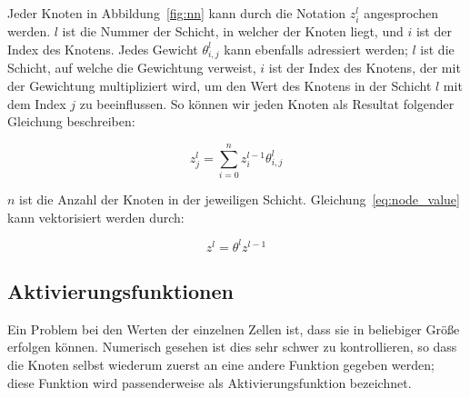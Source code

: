 Jeder Knoten in Abbildung~\ref{fig:nn} kann durch die Notation $z^l_i$ angesprochen werden.
$l$ ist die Nummer der Schicht, in welcher der Knoten liegt, und $i$ ist der Index des Knotens.
Jedes Gewicht $\theta^l_{i, j}$ kann ebenfalls adressiert werden; $l$ ist die Schicht, auf welche die Gewichtung verweist, $i$ ist der Index des Knotens, der mit der Gewichtung multipliziert wird, um den Wert des Knotens in der Schicht $l$ mit dem Index $j$ zu beeinflussen.
So können wir jeden Knoten als Resultat folgender Gleichung beschreiben:

\begin{equation}
    z^l_j = \sum^n_{i=0}z^{l-1}_i\theta^l_{i, j}
    \label{eq:node_value}
\end{equation}

$n$ ist die Anzahl der Knoten in der jeweiligen Schicht. Gleichung~\eqref{eq:node_value} kann vektorisiert werden durch:

\begin{equation}
    z^l = \theta^l z^{l-1}
    \label{eq:node_value_vectorized}
\end{equation}

\subsection{Aktivierungsfunktionen}

Ein Problem bei den Werten der einzelnen Zellen ist, dass sie in beliebiger Größe erfolgen können. Numerisch gesehen ist dies sehr schwer zu kontrollieren, so dass die Knoten selbst wiederum zuerst an eine andere Funktion gegeben werden; diese Funktion wird passenderweise als Aktivierungsfunktion bezeichnet.


